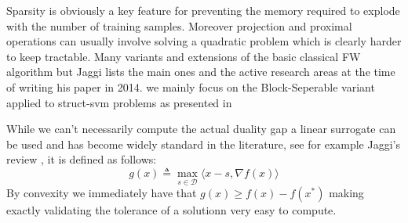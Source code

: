 
Sparsity is obviously a key feature for preventing the memory required to
explode with the number of training samples. Moreover projection and proximal
operations can usually involve solving a quadratic problem which is clearly
harder to keep tractable. Many variants and extensions of the basic classical FW
algorithm but Jaggi lists the main ones and the active research areas at the
time of writing his paper in 2014. %
we mainly focus on the Block-Seperable variant applied to struct-svm problems as
presented in \citet{lacoste-julienBlockCoordinateFrankWolfeOptimization2013}

While we can't necessarily compute the  actual duality gap
a linear surrogate can be used and has become widely standard
in the literature, see for example Jaggi's review
\citep{jaggiRevisitingFrankWolfeProjectionFree2013},
it is defined as follows:
\begin{equation}
  g(x) \triangleq \max_{s\in \mathcal D} \langle x-s,\nabla f(x)\rangle
\end{equation} 
By convexity we immediately have that $g(x) \geq f(x) - f(x^*)$ making
exactly validating the tolerance of a solutionn very easy to compute.
